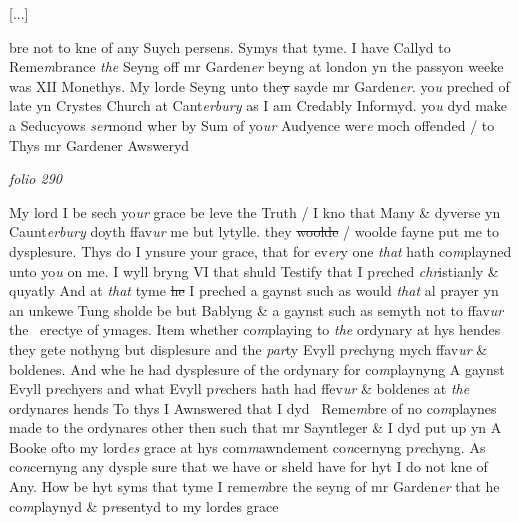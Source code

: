 \documentclass[12pt, a4paper]{book}
\begin{document}
				[...]
			
			bre not to kne of any Suych persens. Symys that tyme. I have Callyd to Reme\textit{m}brance \textit{the} Seyng off mr Garden\textit{er} beyng at london yn the passyon weeke was XII Monethys. My lorde Seyng unto the\sout{y} sayde mr Garden\textit{er}. yo\textit{u} preched of late yn Crystes Church at Cant\textit{erbury} as I am Credably Informyd. yo\textit{u} dyd make a Seducyows \textit{ser}mond wher by  Sum of yo\textit{ur} Audyence wer\textit{e} moch offended / to Thys mr Gardener Awsweryd

\dotfill
					

\textit{folio 290}


My lord I be sech yo\textit{ur} grace be leve the Truth / I kno that Many \& dyverse yn Caunt\textit{erbury} doyth ffav\textit{ur} me but lytylle. they \sout{woolde }/ woolde fayne put me to dysplesure. Thys do I ynsure your grace, that for ev\textit{er}y one \textit{that} hath co\textit{m}playned unto yo\textit{u} on me. I wyll bryng VI that shuld Testify that I p\textit{re}ched \textit{chr}istianly \& quyatly And at \textit{that} tyme \sout{he }
               I
			 preched a gaynst such as would \textit{that} al prayer yn an unkewe Tung sholde be but Bablyng \& a gaynst such as semyth not to ffav\textit{ur} the  erectye of ymages. Item whether co\textit{m}playing to \textit{the} ordynary at hys hendes they gete nothyng but displesure and the \textit{par}ty Evyll p\textit{re}chyng mych ffav\textit{ur} \& boldenes. And whe he had dysplesure of the ordynary for co\textit{m}playnyng A gaynst Evyll p\textit{re}chyers and what Evyll p\textit{re}chers hath had ffev\textit{ur} \& boldenes at \textit{the} ordynares hends To thys I Awnswered that I dyd 
			 Reme\textit{m}bre of no co\textit{m}playnes made to the ordynares other then such that mr Sayntleger \& I dyd put up yn A Booke ofto my lord\textit{es} grace at hys com\textit{m}awndement co\textit{n}cernyng p\textit{re}chyng. As co\textit{n}cernyng any dysple sure that we have or sheld have for hyt I do not kne of Any.  How be hyt syms that tyme I reme\textit{m}bre the seyng of mr Garden\textit{er} that he  
			 co\textit{m}playnyd \& p\textit{re}sentyd to my lordes grace
			
\end{document}
